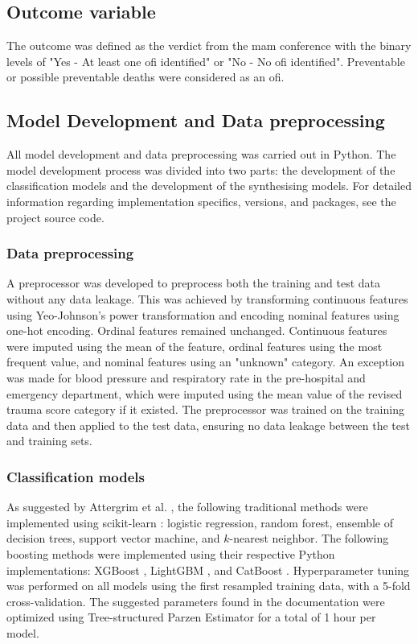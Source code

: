 \documentclass[12pt, a4paper]{article}
\begin{document}
\subsection{Outcome variable}
The outcome was defined as the verdict from the \acrshort{mam} conference with the binary levels of "Yes - At least one \acrshort{ofi} identified" or "No - No \acrshort{ofi} identified". Preventable or possible preventable deaths were considered as an \acrshort{ofi}.

\subsection{Model Development and Data preprocessing}
All model development and data preprocessing was carried out in Python. The model development process was divided into two parts: the development of the classification models and the development of the synthesising models. For detailed information regarding implementation specifics, versions, and packages, see the project source code.

\subsubsection*{Data preprocessing}
A preprocessor was developed to preprocess both the training and test data without any data leakage. This was achieved by transforming continuous features using Yeo-Johnson's power transformation \cite{yeo_new_2000} and encoding nominal features using one-hot encoding. Ordinal features remained unchanged. Continuous features were imputed using the mean of the feature, ordinal features using the most frequent value, and nominal features using an "unknown" category. An exception was made for blood pressure and respiratory rate in the pre-hospital and emergency department, which were imputed using the mean value of the revised trauma score category \cite{ringdal_utstein_2008} if it existed. The preprocessor was trained on the training data and then applied to the test data, ensuring no data leakage between the test and training sets.

\subsubsection*{Classification models}
As suggested by Attergrim et al. \cite{attergrim_predicting_2023}, the following traditional methods were implemented using scikit-learn \cite{pedregosa_scikit_2011}: logistic regression, random forest, ensemble of decision trees, support vector machine, and $k$-nearest neighbor. The following boosting methods were implemented using their respective Python implementations: XGBoost \cite{chen_xgboost_2016}, LightGBM \cite{ke_lightgbm_2017}, and CatBoost \cite{prokhorenkova_catboost_2018}. Hyperparameter tuning was performed on all models using the first resampled training data, with a 5-fold cross-validation. The suggested parameters found in the documentation were optimized using Tree-structured Parzen Estimator \cite{bergstra_algorithms_2011} for a total of 1 hour per model.
\end{document}
